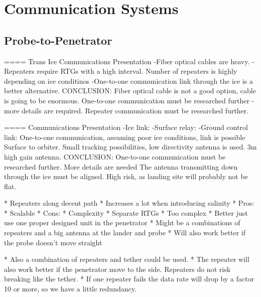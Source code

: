 \chapter{Communication Systems}





	

\section{Probe-to-Penetrator}




==== Trans Ice Communications Presentation
    -Fiber optical cables are heavy.
    -Repeaters require RTGs with a high interval. Number of repeaters is highly depending on ice conditinos
    -One-to-one communication link through the ice is a better alternative.
CONCLUSION: Fiber optical cable is not a good option, cable is going to be enormous.
            One-to-one communication must be researched further - more details are required.
            Repeater communication must be researched further.
            
==== Communications Presentation
-Ice link:
-Surface relay:
-Ground control link:
One-to-one communication, assuming poor ice conditions, link is possible
Surface to orbiter. Small tracking possibilities, low directivity antenna is used.
3m high gain antenna.
CONCLUSION: One-to-one communication must be researched further. More details are needed
            The antenna transmitting down through the ice must be aligned. High risk, as landing site will probably not be flat.

* Repeaters along decent path
	* Increases a lot when introducing salinity
	* Pros:
		* Scalable
	* Cons:
		* Complexity
		* Separate RTGs
	* Too complex
		* Better just use one proper designed unit in the penetrator
		* Might be a combinations of repeaters and a big antenna at the lander and probe
		* Will also work better if the probe doesn't move straight

	* Also a combination of repeaters and tether could be used.
	* The repeater will also work better if the penetrator move to the side. Repeaters do not risk breaking like the tether.
	* If one repeater fails the data rate will drop by a factor 10 or more, so we have a little redundancy.
